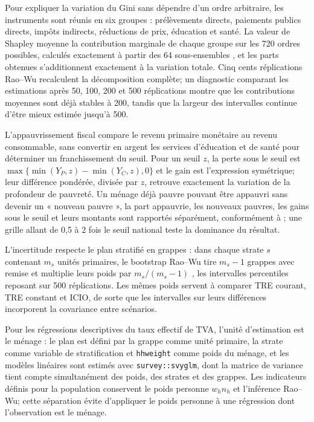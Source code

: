\documentclass[11pt,a4paper]{article}
\begin{document}
Pour expliquer la variation du Gini sans dépendre d'un ordre arbitraire, les
instruments sont réunis en six groupes : prélèvements directs, paiements publics
directs, impôts indirects, réductions de prix, éducation et santé. La valeur de
Shapley moyenne la contribution marginale de chaque groupe sur les 720 ordres
possibles, calculés exactement à partir des 64 sous-ensembles
\citep{shorrocks2013}, et les parts obtenues s'additionnent exactement à la
variation totale. Cinq cents réplications Rao--Wu recalculent la décomposition
complète; un diagnostic comparant les estimations après 50, 100, 200 et 500
réplications montre que les contributions moyennes sont déjà stables à 200,
tandis que la largeur des intervalles continue d'être mieux estimée jusqu'à 500.

L'appauvrissement fiscal compare le revenu primaire monétaire au revenu
consommable, sans convertir en argent les services d'éducation et de santé pour
déterminer un franchissement du seuil. Pour un seuil $z$, la perte sous le seuil
est $\max\{\min(Y_P,z)-\min(Y_C,z),0\}$ et le gain est l'expression symétrique;
leur différence pondérée, divisée par $z$, retrouve exactement la variation de
la profondeur de pauvreté. Un ménage déjà pauvre pouvant être appauvri sans
devenir un « nouveau pauvre », la part appauvrie, les nouveaux pauvres, les
gains sous le seuil et leurs montants sont rapportés séparément, conformément à
\citet{higgins2016}; une grille allant de 0,5 à 2 fois le seuil national teste la
dominance du résultat.

L'incertitude respecte le plan stratifié en grappes : dans chaque strate $s$
contenant $m_s$ unités primaires, le bootstrap Rao--Wu tire $m_s-1$ grappes avec
remise et multiplie leurs poids par $m_s/(m_s-1)$ \citep{raowu1988}, les
intervalles percentiles reposant sur 500 réplications. Les mêmes poids servent à
comparer TRE courant, TRE constant et ICIO, de sorte que les intervalles sur
leurs différences incorporent la covariance entre scénarios.

Pour les régressions descriptives du taux effectif de TVA, l'unité d'estimation
est le ménage : le plan est défini par la grappe comme unité primaire, la strate
comme variable de stratification et \texttt{hhweight} comme poids du ménage, et
les modèles linéaires sont estimés avec \texttt{survey::svyglm}, dont la matrice
de variance tient compte simultanément des poids, des strates et des grappes.
Les indicateurs définis pour la population conservent le poids personne
$w_hn_h$ et l'inférence Rao--Wu; cette séparation évite d'appliquer le poids
personne à une régression dont l'observation est le ménage.
\end{document}
